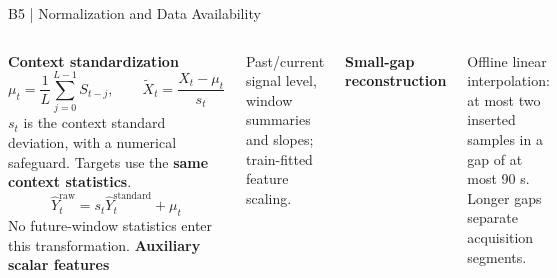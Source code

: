 \begin{frame}[noframenumbering]{B5 | Normalization and Data Availability}
\begin{columns}[T,onlytextwidth]
\textbf{Context standardization}
\[
\mu_t=\frac{1}{L}\sum_{j=0}^{L-1}S_{t-j},\qquad
\widetilde X_t=\frac{X_t-\mu_t}{s_t}
\]
\small $s_t$ is the context standard deviation, with a numerical safeguard. Targets use the \textbf{same context statistics}.
\[
\widehat Y_t^{\mathrm{raw}}=s_t\widehat Y_t^{\mathrm{standard}}+\mu_t
\]
\small No future-window statistics enter this transformation.
\textbf{Auxiliary scalar features}
\small\par\vspace{3mm}
Past/current signal level, window summaries and slopes; train-fitted feature scaling.
\vspace{5mm}

\textbf{Small-gap reconstruction}\par\vspace{2mm}
Offline linear interpolation: at most two inserted samples in a gap of at most 90 s. Longer gaps separate acquisition segments.
\end{columns}
\end{frame}

